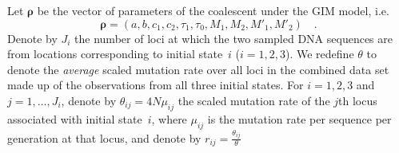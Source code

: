 \documentclass[11pt]{article}
\begin{document}
Let $\boldsymbol{\rho}$ be the vector of parameters of the coalescent under the GIM model, i.e. 
\begin{equation*}
\boldsymbol{\rho}=(a, b, c_{1}, c_{2}, \tau_{1}, \tau_{0}, M_{1},  M_{2},  M'_{1},  M'_{2}) \quad.
\end{equation*}
Denote by $J_i$ the number of loci at which the two sampled DNA sequences are from locations corresponding to initial state~$i$ ($i=1,2,3$).
We redefine $\theta$ to denote the \textit{average} scaled mutation rate over all loci in the combined data set made up of the observations from
all three initial states. For $i=1,2,3$ and $j=1,\ldots,J_i$,
denote by $\theta_{ij}=4N\mu_{ij}$ the scaled mutation rate of the $j$th locus associated with initial state~$i$, where $\mu_{ij}$ is the mutation rate per sequence per generation at that locus, and denote by $r_{ij}=\frac{\theta_{ij}}{\theta}$
\end{document}
